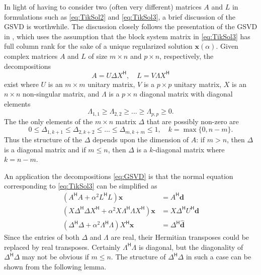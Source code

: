 \documentclass[12pt]{article}
\newcommand{\dVec}{\mathbf{d}}	%
\newcommand{\xVec}{\mathbf{x}}	%
\newcommand{\ctrans}[1]{{#1}^\mathsf{H}}	%
\newcommand{\regparam}{\alpha}
\newcommand{\svd}[1]{\widehat{#1}}	%
\begin{document}
In light of having to consider two (often very different) matrices $A$ and $L$ in formulations such as \eqref{eq:TikSol2} and \eqref{eq:TikSol3}, a brief discussion of the GSVD is worthwhile. The discussion closely follows the presentation of the GSVD in \cite{ABT}, which uses the assumption that the block system matrix in \eqref{eq:TikSol3} has full column rank for the sake of a unique regularized solution $\xVec(\regparam)$. Given complex matrices $A$ and $L$ of size $m \times n$ and $p \times n$, respectively, the decompositions
\begin{equation}
\label{eq:GSVD}
A = U\Delta\ctrans{X}, \quad L = V\Lambda\ctrans{X}
\end{equation}
exist where $U$ is an $m \times m$ unitary matrix, $V$ is a $p \times p$ unitary matrix, $X$ is an $n \times n$ non-singular matrix, and $\Lambda$ is a $p \times n$ diagonal matrix with diagonal elements
\[\Lambda_{1,1} \geq \Lambda_{2,2} \geq \ldots \geq \Lambda_{p,p} \geq 0.\]
The the only elements of the $m \times n$ matrix $\Delta$ that are possibly non-zero are
 \[0 \leq \Delta_{1,k+1} \leq \Delta_{2,k+2} \leq \ldots \leq \Delta_{m,k+m} \leq 1, \quad k = \max \{0,n-m\}.\]
Thus the structure of the $\Delta$ depends upon the dimension of $A$: if $m > n$, then $\Delta$ is a diagonal matrix and if $m \leq n$, then $\Delta$ is a $k$-diagonal matrix where $k = n-m$. \par 
An application the decompositions \eqref{eq:GSVD} is that the normal equation corresponding to \eqref{eq:TikSol3} can be simplified as
\begin{align}
(\ctrans{A}A + \regparam^2 \ctrans{L}L)\xVec &= \ctrans{A}\dVec \nonumber \\
(X\ctrans{\Delta}\Delta\ctrans{X} + \regparam^2 X\ctrans{\Lambda}\Lambda\ctrans{X})\xVec &= X\ctrans{\Delta}\ctrans{U}\dVec \nonumber \\
(\ctrans{\Delta}\Delta + \regparam^2 \ctrans{\Lambda}\Lambda)\ctrans{X}\xVec &= \ctrans{\Delta}\svd{\dVec}
\label{eq:Normal equation 2}
\end{align}
Since the entries of both $\Delta$ and $\Lambda$ are real, their Hermitian transposes could be replaced by real transposes. Certainly $\ctrans{\Lambda}\Lambda$ is diagonal, but the diagonality of $\ctrans{\Delta}\Delta$ may not be obvious if $m \leq n$. The structure of $\ctrans{\Delta}\Delta$ in such a case can be shown from the following lemma.
\end{document}
